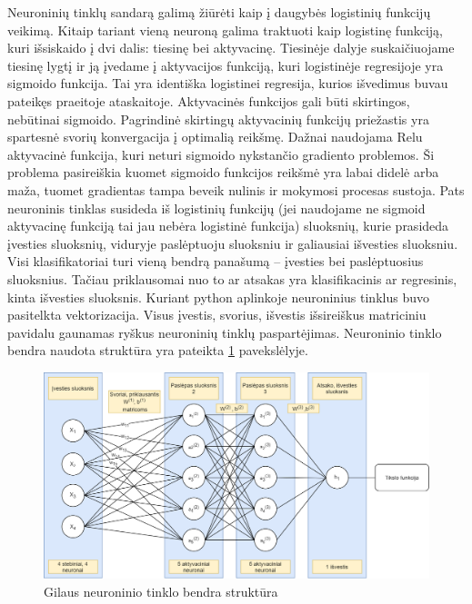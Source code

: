 \documentclass[a4paper, 12pt]{article}
\begin{document}
Neuroninių tinklų sandarą galimą žiūrėti kaip į daugybės logistinių funkcijų veikimą. Kitaip tariant vieną neuroną galima traktuoti kaip logistinę funkciją, kuri išsiskaido į dvi dalis: tiesinę bei aktyvacinę. Tiesinėje dalyje suskaičiuojame tiesinę lygtį ir ją įvedame į aktyvacijos funkciją, kuri logistinėje regresijoje yra sigmoido funkcija. Tai yra identiška logistinei regresija, kurios išvedimus buvau pateikęs praeitoje ataskaitoje. Aktyvacinės funkcijos gali būti skirtingos, nebūtinai sigmoido. Pagrindinė skirtingų aktyvacinių funkcijų priežastis yra spartesnė svorių konvergacija į optimalią reikšmę. Dažnai naudojama Relu aktyvacinė funkcija, kuri neturi sigmoido nykstančio gradiento problemos. Ši problema pasireiškia kuomet sigmoido funkcijos reikšmė yra labai didelė arba maža, tuomet gradientas tampa beveik nulinis ir mokymosi procesas sustoja. 
Pats neuroninis tinklas susideda iš logistinių funkcijų (jei naudojame ne sigmoid aktyvacinę funkciją tai jau nebėra logistinė funkcija) sluoksnių, kurie prasideda įvesties sluoksnių, viduryje paslėptuoju sluoksniu ir galiausiai išvesties sluoksniu. Visi klasifikatoriai turi vieną bendrą panašumą – įvesties bei paslėptuosius sluoksnius. Tačiau priklausomai nuo to ar atsakas yra klasifikacinis ar regresinis, kinta išvesties sluoksnis. Kuriant python aplinkoje neuroninius tinklus buvo pasitelkta vektorizacija. Visus įvestis, svorius, išvestis išsireiškus matriciniu pavidalu gaunamas ryškus neuroninių tinklų paspartėjimas. Neuroninio tinklo bendra naudota struktūra yra pateikta \ref{neuronu diagrama} pavekslėlyje.

\begin{figure}[h]
\centering
\includegraphics[width=1\textwidth]{neuronu diagrama}
\caption{Gilaus neuroninio tinklo bendra struktūra}
\label{neuronu diagrama}
\end{figure}
\end{document}
